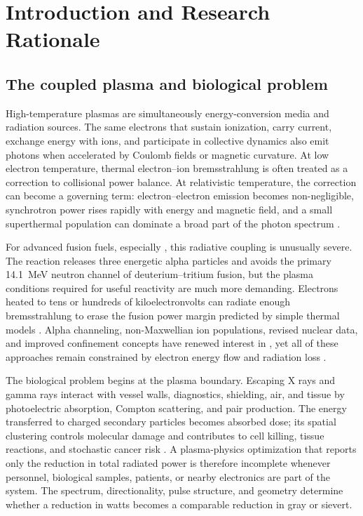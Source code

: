 \chapter{Introduction and Research Rationale}
\label{ch:introduction}

\section{The coupled plasma and biological problem}

High-temperature plasmas are simultaneously energy-conversion media and radiation sources. The same electrons that sustain ionization, carry current, exchange energy with ions, and participate in collective dynamics also emit photons when accelerated by Coulomb fields or magnetic curvature. At low electron temperature, thermal electron--ion bremsstrahlung is often treated as a correction to collisional power balance. At relativistic temperature, the correction can become a governing term: electron--electron emission becomes non-negligible, synchrotron power rises rapidly with energy and magnetic field, and a small superthermal population can dominate a broad part of the photon spectrum \cite{bekefi1966,rybicki1979,blumenthal1970,haug1975,nozawa1998}.

For advanced fusion fuels, especially \pB, this radiative coupling is unusually severe. The reaction releases three energetic alpha particles and avoids the primary \SI{14.1}{\MeV} neutron channel of deuterium--tritium fusion, but the plasma conditions required for useful reactivity are much more demanding. Electrons heated to tens or hundreds of kiloelectronvolts can radiate enough bremsstrahlung to erase the fusion power margin predicted by simple thermal models \cite{rider1995,nevins2000,sikora2016,wurzel2022}. Alpha channeling, non-Maxwellian ion populations, revised nuclear data, and improved confinement concepts have renewed interest in \pB, yet all of these approaches remain constrained by electron energy flow and radiation loss \cite{fisch1992,hay2015,ochs2022,ochs2025constraints}.

The biological problem begins at the plasma boundary. Escaping X rays and gamma rays interact with vessel walls, diagnostics, shielding, air, and tissue by photoelectric absorption, Compton scattering, and pair production. The energy transferred to charged secondary particles becomes absorbed dose; its spatial clustering controls molecular damage and contributes to cell killing, tissue reactions, and stochastic cancer risk \cite{attix1986,turner2007,baatout2023,hall2018,goodhead1994}. A plasma-physics optimization that reports only the reduction in total radiated power is therefore incomplete whenever personnel, biological samples, patients, or nearby electronics are part of the system. The spectrum, directionality, pulse structure, and geometry determine whether a reduction in watts becomes a comparable reduction in gray or sievert.

